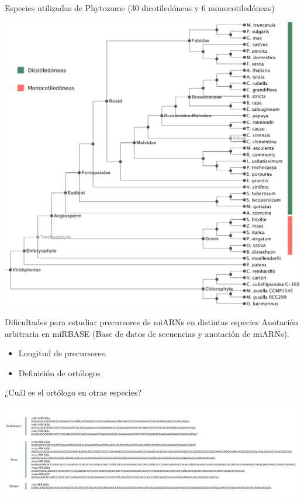\documentclass{beamer}
\begin{document}
\begin{frame}{Especies utilizadas de Phytozome (30 dicotiledóneas y 6 monocotiledóneas)}
	\begin{center}
		\includegraphics[width=.7\textwidth]{img/treePhytozome.png}
	\end{center}
\end{frame}


\begin{frame}{Dificultades para estudiar precursores de miARNs en distintas especies}
    Anotación arbitraria en miRBASE (Base de datos de secuencias y anotación de miARNs).
    \begin{itemize}
        \item Longitud de precursores.
        \item Definición de ortólogos
    \end{itemize}
\end{frame}

\begin{frame}{¿Cuál es el ortólogo en otras especies?}
	\begin{center}
		\includegraphics[width=1\textwidth]{img/ortologos01.png}
	\end{center}
\end{frame}
\end{document}
